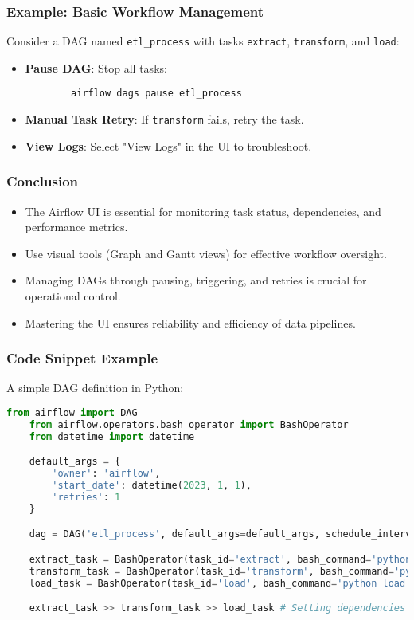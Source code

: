 \documentclass[aspectratio=169]{beamer}
\begin{document}
\begin{frame}[fragile]
    \frametitle{Example: Basic Workflow Management}
    Consider a DAG named \texttt{etl\_process} with tasks \texttt{extract}, \texttt{transform}, and \texttt{load}:
    \begin{itemize}
        \item \textbf{Pause DAG}: Stop all tasks:
        \begin{lstlisting}
        airflow dags pause etl_process
        \end{lstlisting}
        \item \textbf{Manual Task Retry}: If \texttt{transform} fails, retry the task.
        \item \textbf{View Logs}: Select "View Logs" in the UI to troubleshoot.
    \end{itemize}
\end{frame}

\begin{frame}[fragile]
    \frametitle{Conclusion}
    \begin{itemize}
        \item The Airflow UI is essential for monitoring task status, dependencies, and performance metrics.
        \item Use visual tools (Graph and Gantt views) for effective workflow oversight.
        \item Managing DAGs through pausing, triggering, and retries is crucial for operational control.
        \item Mastering the UI ensures reliability and efficiency of data pipelines.
    \end{itemize}
\end{frame}

\begin{frame}[fragile]
    \frametitle{Code Snippet Example}
    A simple DAG definition in Python:
    \begin{lstlisting}[language=Python]
    from airflow import DAG
    from airflow.operators.bash_operator import BashOperator
    from datetime import datetime

    default_args = {
        'owner': 'airflow',
        'start_date': datetime(2023, 1, 1),
        'retries': 1
    }

    dag = DAG('etl_process', default_args=default_args, schedule_interval='@daily')

    extract_task = BashOperator(task_id='extract', bash_command='python extract.py', dag=dag)
    transform_task = BashOperator(task_id='transform', bash_command='python transform.py', dag=dag)
    load_task = BashOperator(task_id='load', bash_command='python load.py', dag=dag)

    extract_task >> transform_task >> load_task # Setting dependencies
    \end{lstlisting}
\end{frame}
\end{document}
